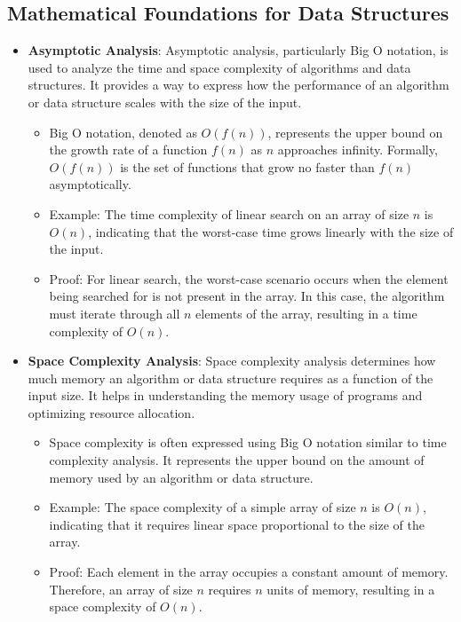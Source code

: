 \documentclass[12pt]{book} %
\begin{document}
\subsection{Mathematical Foundations for Data Structures}
\begin{itemize}
    \item \textbf{Asymptotic Analysis}: Asymptotic analysis, particularly Big O notation, is used to analyze the time and space complexity of algorithms and data structures. It provides a way to express how the performance of an algorithm or data structure scales with the size of the input.
    \begin{itemize}
        \item Big O notation, denoted as \(O(f(n))\), represents the upper bound on the growth rate of a function \(f(n)\) as \(n\) approaches infinity. Formally, \(O(f(n))\) is the set of functions that grow no faster than \(f(n)\) asymptotically.
        \item Example: The time complexity of linear search on an array of size \(n\) is \(O(n)\), indicating that the worst-case time grows linearly with the size of the input.
        \item Proof: For linear search, the worst-case scenario occurs when the element being searched for is not present in the array. In this case, the algorithm must iterate through all \(n\) elements of the array, resulting in a time complexity of \(O(n)\).
    \end{itemize}
    \item \textbf{Space Complexity Analysis}: Space complexity analysis determines how much memory an algorithm or data structure requires as a function of the input size. It helps in understanding the memory usage of programs and optimizing resource allocation.
    \begin{itemize}
        \item Space complexity is often expressed using Big O notation similar to time complexity analysis. It represents the upper bound on the amount of memory used by an algorithm or data structure.
        \item Example: The space complexity of a simple array of size \(n\) is \(O(n)\), indicating that it requires linear space proportional to the size of the array.
        \item Proof: Each element in the array occupies a constant amount of memory. Therefore, an array of size \(n\) requires \(n\) units of memory, resulting in a space complexity of \(O(n)\).
    \end{itemize}
\end{itemize}
\end{document}
